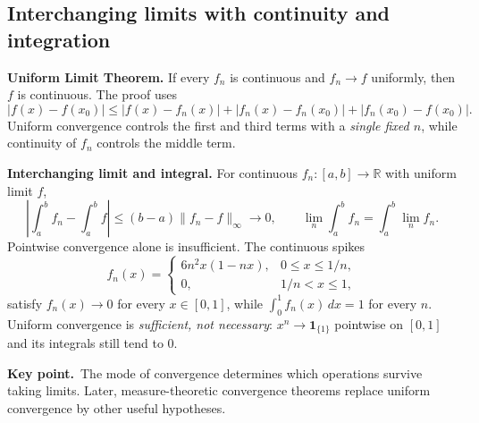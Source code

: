 \documentclass[10pt,a4paper]{article}
\newcommand{\R}{\mathbb R}
\newcommand{\key}[1]{\par\smallskip\textcolor{accent}{\textbf{Key point.}}\ #1\par}
\begin{document}
\subsection{Interchanging limits with continuity and integration}
\textbf{Uniform Limit Theorem.} If every $f_n$ is continuous and $f_n\to f$ uniformly, then $f$ is continuous. The proof uses
\[
|f(x)-f(x_0)|\le |f(x)-f_n(x)|+|f_n(x)-f_n(x_0)|+|f_n(x_0)-f(x_0)|.
\]
Uniform convergence controls the first and third terms with a \emph{single fixed $n$}, while continuity of $f_n$ controls the middle term.

\textbf{Interchanging limit and integral.} For continuous $f_n:[a,b]\to\R$ with uniform limit $f$,
\[
\boxed{\left|\int_a^b f_n-\int_a^b f\right|
\le(b-a)\|f_n-f\|_\infty\to0,\qquad
\lim_n\int_a^b f_n=\int_a^b\lim_n f_n.}
\]
Pointwise convergence alone is insufficient. The continuous spikes
\[
f_n(x)=\begin{cases}6n^2x(1-nx),&0\le x\le1/n,\\0,&1/n<x\le1,\end{cases}
\]
satisfy $f_n(x)\to0$ for every $x\in[0,1]$, while $\int_0^1f_n(x)\,dx=1$ for every $n$. Uniform convergence is \emph{sufficient, not necessary}: $x^n\to\mathbf1_{\{1\}}$ pointwise on $[0,1]$ and its integrals still tend to $0$.

\key{The mode of convergence determines which operations survive taking limits. Later, measure-theoretic convergence theorems replace uniform convergence by other useful hypotheses.}
\end{document}
